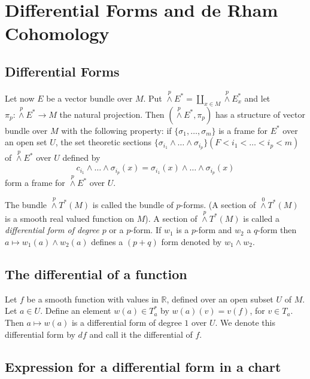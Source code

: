 \chapter{Differential Forms and de Rham Cohomology}\label{chap4}

\section*{Differential Forms}

Let now $E$ be a vector bundle over $M$. Put ${\displaystyle{\mathop{\wedge}\limits^{p}}}E^{*}=\coprod\limits_{x\in M}{\displaystyle{\mathop{\wedge}\limits^{p}}}E^{*}_{x}$ and let $\pi_{p}:{\displaystyle{\mathop{\wedge}\limits^{p}}}E^{*}\to M$ the natural projection. Then $({\displaystyle{\mathop{\wedge}\limits^{p}}}E^{*},\pi_{p})$ has a structure of vector bundle over $M$ with the following property: if $\{\sigma_{1},\ldots,\sigma_{m}\}$ is a frame for $E^{*}$ over an open set $U$, the set theoretic sections $\{\sigma_{i_{1}}\wedge\ldots \wedge \sigma_{i_{p}}\}(F<i_{1}<\ldots < i_{p}<m)$ of ${\displaystyle{\mathop{\wedge}\limits^{p}}}E^{*}$ over $U$ defined by
$$
c_{i_{1}}\wedge\ldots\wedge \sigma_{i_{p}}(x)=\sigma_{i_{1}}(x)\wedge\ldots\wedge \sigma_{i_{p}}(x)
$$
form a frame for ${\displaystyle{\mathop{\wedge}\limits^{p}}}E^{*}$ over $U$.

The bundle ${\displaystyle{\mathop{\wedge}\limits^{p}}}T^{*}(M)$ is called the bundle of $p$-forms. (A section of ${\displaystyle{\mathop{\wedge}\limits^{0}}}T^{*}(M)$ is a smooth real valued function on $M$). A section of ${\displaystyle{\mathop{\wedge}\limits^{p}}}T^{*}(M)$ is called a {\em differential form of degree $p$} or a $p$-form. If $w_{1}$ is a $p$-form and $w_{2}$ a $q$-form then $a\mapsto w_{1}(a)\wedge w_{2}(a)$ defines a $(p+q)$ form denoted by $w_{1}\wedge w_{2}$.

\section*{The differential of a function}

Let $f$ be a smooth function with values in $\mathbb{R}$, defined over an open subset $U$ of $M$. Let $a\in U$. Define an element $w(a)\in T^{*}_{a}$ by $w(a)(v)=v(f)$, for $v\in T_{a}$. Then $a\mapsto w(a)$ is a differential form of degree $1$ over $U$. We denote this differential form by $df$ and call it the differential of $f$.

\section*{Expression for a differential form in a chart}
\pageoriginale

